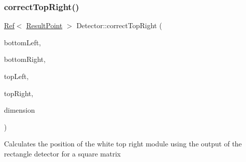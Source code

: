 \subsubsection{\texorpdfstring{correct\+Top\+Right()}{correctTopRight()}}
{\footnotesize\ttfamily \mbox{\hyperlink{classzxing_1_1_ref}{Ref}}$<$ \mbox{\hyperlink{classzxing_1_1_result_point}{Result\+Point}} $>$ Detector\+::correct\+Top\+Right (\begin{DoxyParamCaption}\item[{\mbox{\hyperlink{classzxing_1_1_ref}{Ref}}$<$ \mbox{\hyperlink{classzxing_1_1_result_point}{Result\+Point}} $>$}]{bottom\+Left,  }\item[{\mbox{\hyperlink{classzxing_1_1_ref}{Ref}}$<$ \mbox{\hyperlink{classzxing_1_1_result_point}{Result\+Point}} $>$}]{bottom\+Right,  }\item[{\mbox{\hyperlink{classzxing_1_1_ref}{Ref}}$<$ \mbox{\hyperlink{classzxing_1_1_result_point}{Result\+Point}} $>$}]{top\+Left,  }\item[{\mbox{\hyperlink{classzxing_1_1_ref}{Ref}}$<$ \mbox{\hyperlink{classzxing_1_1_result_point}{Result\+Point}} $>$}]{top\+Right,  }\item[{int}]{dimension }\end{DoxyParamCaption})\hspace{0.3cm}{\ttfamily [protected]}}

Calculates the position of the white top right module using the output of the rectangle detector for a square matrix \mbox{\label{classzxing_1_1datamatrix_1_1_detector_afbf5fea4c097a6bce2c3a5606daf6d0f}} 
